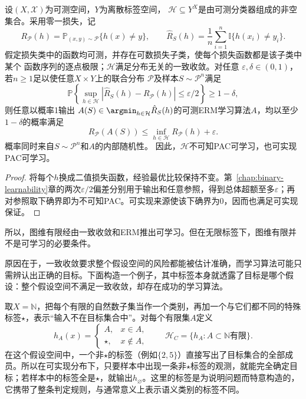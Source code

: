 \begin{theorem}[一致收敛推出可学习性]
\label{thm:multiclass-uniform-pac}
设$(X,\mathcal X)$为可测空间，$Y$为离散标签空间，
$\mathcal H\subseteq Y^X$是由可测分类器组成的非空集合。采用零一损失，记
\[
 R_{\mathcal P}(h)=\mathbb P_{(x,y)\sim\mathcal P}\{h(x)\neq y\},\qquad
 \hat R_S(h)=\frac1n\sum_{i=1}^n\mathbb I\{h(x_i)\neq y_i\}.
\]
假定损失类中的函数均可测，并存在可数损失子类，使每个损失函数都是该子类中某个
函数序列的逐点极限；$\mathcal H$满足分布无关的一致收敛。对任意
$\varepsilon,\delta\in(0,1)$，若$n\geq1$足以使任意$X\times Y$上的联合分布
$\mathcal P$及样本$S\sim\mathcal P^n$满足
\[
 \mathbb P\!\left\{
 \sup_{h\in\mathcal H}|\hat R_S(h)-R_{\mathcal P}(h)|\leq\varepsilon/2
 \right\}\geq1-\delta,
\]
则任意以概率1输出
$A(S)\in\argmin_{h\in\mathcal H}\hat R_S(h)$的可测ERM学习算法$A$，均以至少
$1-\delta$的概率满足
\[
 R_{\mathcal P}(A(S))\leq\inf_{h\in\mathcal H}R_{\mathcal P}(h)+\varepsilon.
\]
概率同时来自$S\sim\mathcal P^n$和$A$的内部随机性。
因此，$\mathcal H$不可知PAC可学习，也可实现PAC可学习。
\end{theorem}

\begin{proof}
将每个$h$换成二值损失函数，经验最优比较保持不变。第~\ref{chap:binary-learnability}章的两次$\varepsilon/2$偏差分别用于输出和任意参照，得到总体超额至多$\varepsilon$；再对参照取下确界即为不可知PAC。可实现来源使该下确界为0，因而也满足可实现保证。
\end{proof}

所以，图维有限经由一致收敛和ERM推出可学习。但在无限标签下，图维有限并不是可学习的必要条件。

原因在于，一致收敛要求整个假设空间的风险都能被估计准确，而学习算法可能只需辨认出正确的目标。下面构造一个例子，其中标签本身就透露了目标是哪个假设：整个假设空间不满足一致收敛，却存在成功的学习算法。

取$X=\mathbb N$，把每个有限的自然数子集当作一个类别，再加一个与它们都不同的特殊标签$\star$，表示“输入不在目标集合中”。对每个有限集$A$定义
\begin{equation}
 h_A(x)=\begin{cases}A,&x\in A,\\\star,&x\notin A,\end{cases}
 \qquad\mathcal H_C=\{h_A:A\subset\mathbb N\text{有限}\}.
 \label{eq:cantor-class}
\end{equation}
在这个假设空间中，一个非$\star$的标签（例如$\{2,5\}$）直接写出了目标集合的全部成员。所以在可实现分布下，只要样本中出现一条非$\star$标签的观测，就能完全确定目标；若样本中的标签全是$\star$，就输出$h_{\varnothing}$。这里的标签是为说明问题而特意构造的，它携带了整条判定规则，与通常意义上表示语义类别的标签不同。

